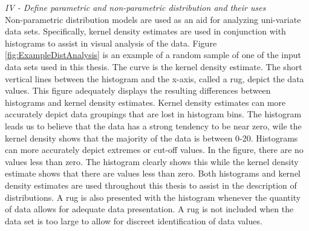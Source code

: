 \begin{linenumbers}
\emph{IV - Define parametric and non-parametric distribution and their uses}\\
Non-parametric distribution models are used as an aid for analyzing uni-variate data sets.  Specifically, kernel density estimates are used in conjunction with histograms to assist in visual analysis of the data.  Figure \ref{fig:ExampleDistAnalysis} is an example of a random sample of one of the input data sets used in this thesis.  The curve is the kernel density estimate.  The short vertical lines between the histogram and the x-axis, called a rug, depict the data values.  This figure adequately displays the resulting differences between histograms and kernel density estimates.  Kernel density estimates can more accurately depict data groupings that are lost in histogram bins.  The histogram leads us to believe that the data has a strong tendency to be near zero, wile the kernel density shows that the majority of the data is between 0-20.  Histograms can more accurately depict extremes or cut-off values.  In the figure, there are no values less than zero.  The histogram clearly shows this while the kernel density estimate shows that there are values less than zero.  Both histograms and kernel density estimates are used throughout this thesis to assist in the description of distributions.  A rug is also presented with the histogram whenever the quantity of data allows for adequate data presentation.  A rug is not included when the data set is too large to allow for discreet identification of data values.


\end{linenumbers}
